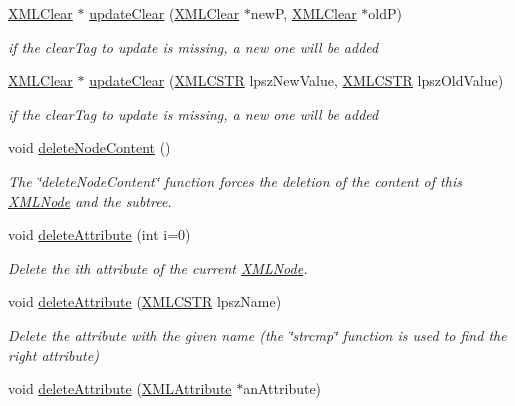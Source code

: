 \begin{DoxyCompactItemize}
\hyperlink{structXMLClear}{X\-M\-L\-Clear} $\ast$ \hyperlink{group__xmlUpdate_ga1279bfaade1376d25342440bd14dbb74}{update\-Clear} (\hyperlink{structXMLClear}{X\-M\-L\-Clear} $\ast$new\-P, \hyperlink{structXMLClear}{X\-M\-L\-Clear} $\ast$old\-P)
\begin{DoxyCompactList}\small\item\em if the clear\-Tag to update is missing, a new one will be added \end{DoxyCompactList}\item 
\hyperlink{structXMLClear}{X\-M\-L\-Clear} $\ast$ \hyperlink{group__xmlUpdate_ga49ad66755cd9b69fc1ec7a78cd162c70}{update\-Clear} (\hyperlink{xmlParser_8h_acdb0d6fd8dd596384b438d86cfb2b182}{X\-M\-L\-C\-S\-T\-R} lpsz\-New\-Value, \hyperlink{xmlParser_8h_acdb0d6fd8dd596384b438d86cfb2b182}{X\-M\-L\-C\-S\-T\-R} lpsz\-Old\-Value)
\begin{DoxyCompactList}\small\item\em if the clear\-Tag to update is missing, a new one will be added \end{DoxyCompactList}\item 
void \hyperlink{group__xmlDelete_gaa4d133999da220e916bdf3a969d493c4}{delete\-Node\-Content} ()
\begin{DoxyCompactList}\small\item\em The \char`\"{}delete\-Node\-Content\char`\"{} function forces the deletion of the content of this \hyperlink{structXMLNode}{X\-M\-L\-Node} and the subtree. \end{DoxyCompactList}\item 
void \hyperlink{group__xmlDelete_ga61b2405305063594b35b309cc2e22c01}{delete\-Attribute} (int i=0)
\begin{DoxyCompactList}\small\item\em Delete the ith attribute of the current \hyperlink{structXMLNode}{X\-M\-L\-Node}. \end{DoxyCompactList}\item 
void \hyperlink{group__xmlDelete_ga2b21339e5b370f1d7ebde2dc51217eed}{delete\-Attribute} (\hyperlink{xmlParser_8h_acdb0d6fd8dd596384b438d86cfb2b182}{X\-M\-L\-C\-S\-T\-R} lpsz\-Name)
\begin{DoxyCompactList}\small\item\em Delete the attribute with the given name (the \char`\"{}strcmp\char`\"{} function is used to find the right attribute) \end{DoxyCompactList}\item 
void \hyperlink{group__xmlDelete_ga6f00d7c1b4eaa29cfdd9d4a709495aca}{delete\-Attribute} (\hyperlink{structXMLAttribute}{X\-M\-L\-Attribute} $\ast$an\-Attribute)

\end{DoxyCompactItemize}
